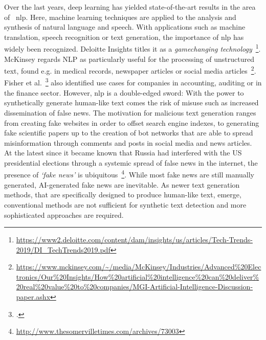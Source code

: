 Over the last years, deep learning has yielded state-of-the-art results in the area of ~\gls{nlp}. Here, machine learning techniques are applied to the analysis and synthesis of natural language and speech. With applications such as machine translation, speech recognition or text generation, the importance of \gls{nlp} has widely been recognized. Deloitte Insights titles it as a \textit{gamechanging technology}~\footnote{\url{https://www2.deloitte.com/content/dam/insights/us/articles/Tech-Trends-2019/DI_TechTrends2019.pdf}}. McKinsey regards NLP as particularly useful for the processing of unstructured text, found e.g. in medical records, newspaper articles or social media articles~\footnote{\url{https://www.mckinsey.com/~/media/McKinsey/Industries/Advanced\%20Electronics/Our\%20Insights/How\%20artificial\%20intelligence\%20can\%20deliver\%20real\%20value\%20to\%20companies/MGI-Artificial-Intelligence-Discussion-paper.ashx}}. Fisher et al.~\footcite{doi:10.1002/isaf.1386} also identified use cases for companies in accounting, auditing or in the finance sector. However, \gls{nlp} is a double-edged sword: With the power to synthetically generate human-like text comes the risk of misuse such as increased dissemination of false news. The motivation for malicious text generation ranges from creating fake websites in order to offset search engine indexes, to generating fake scientific papers up to the creation of bot networks that are able to spread misinformation through comments and posts in social media and news articles. At the latest since it became known that Russia had interfered with the US presidential elections through a systemic spread of false news in the internet, the presence of \textit{`fake news'} is ubiquitous~\footnote{\url{http://www.thesomervilletimes.com/archives/73003}}. While most fake news are still manually generated, AI-generated fake news are inevitable. As newer text generation methods, that are specifically designed to produce human-like text, emerge, conventional methods are not sufficient for synthetic text detection and more sophisticated approaches are required.

